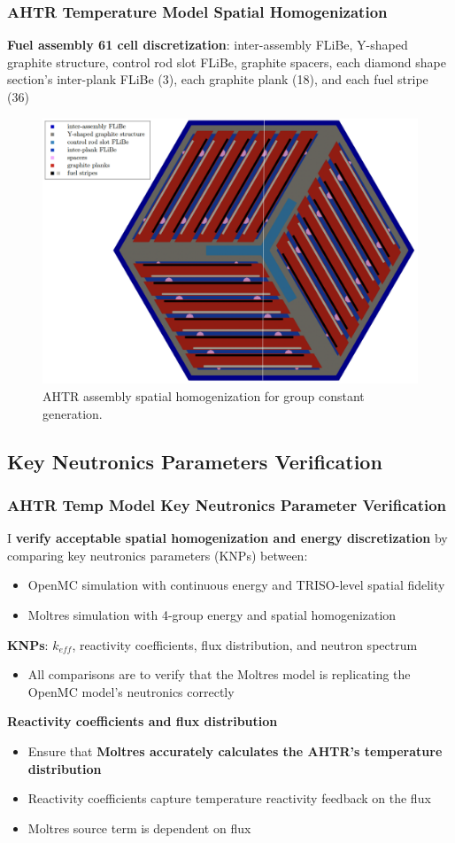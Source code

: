 \begin{frame}
    \frametitle{AHTR Temperature Model Spatial Homogenization}
        \textbf{Fuel assembly 61 cell discretization}: inter-assembly FLiBe, 
        Y-shaped graphite structure, control rod slot FLiBe, graphite spacers, 
        each diamond shape section's inter-plank FLiBe (3), each graphite plank (18), 
        and each fuel stripe (36)
    \begin{figure}[]
            \centering
            \includegraphics[width=0.65\linewidth]{figures/assembly_mg_pres.png}
        \caption{AHTR assembly spatial homogenization for group constant generation.}
    \end{figure}
\end{frame}

\subsection{Key Neutronics Parameters Verification}
\begin{frame}
    \frametitle{AHTR Temp Model Key Neutronics Parameter Verification}
    I \textbf{verify acceptable spatial homogenization and energy discretization} by 
    comparing key neutronics parameters (KNPs) between: 
    \begin{itemize} 
        \item OpenMC simulation with continuous energy and TRISO-level spatial fidelity
        \item Moltres simulation with 4-group energy and spatial homogenization
    \end{itemize}
    \textbf{KNPs}: $k_{eff}$, reactivity coefficients, flux distribution, and neutron 
    spectrum
    \begin{itemize}
        \item All comparisons are to verify that the Moltres model is replicating the 
        OpenMC model's neutronics correctly
    \end{itemize}
    \textbf{Reactivity coefficients and flux distribution}
    \begin{itemize}
        \item Ensure that \textbf{Moltres accurately calculates the AHTR's temperature 
        distribution}
        \item Reactivity coefficients capture temperature reactivity feedback on the flux
        \item Moltres source term is dependent on flux 
    \end{itemize}
\end{frame}

